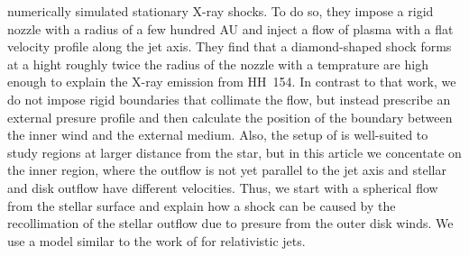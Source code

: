 \citet{2011ApJ...737...54B} numerically simulated stationary X-ray shocks. To do so, they impose a rigid nozzle with a radius of a few hundred AU and inject a flow of plasma with a flat velocity profile along the jet axis. They find that a diamond-shaped shock forms at a hight roughly twice the radius of the nozzle with a temprature are high enough to explain the X-ray emission from HH~154. In contrast to that work, we do not impose rigid boundaries that collimate the flow, but instead prescribe an external presure profile and then calculate the position of the boundary between the inner wind and the external medium. Also, the setup of \citet{2011ApJ...737...54B} is well-suited to study regions at larger distance from the star, but in this article we concentate on the inner region, where the outflow is not yet parallel to the jet axis and stellar and disk outflow have different velocities. Thus, we start with a spherical flow from the stellar surface and explain how a shock can be caused by the recollimation of the stellar outflow due to presure from the outer disk winds. We use a model similar to the work of \citet{2012MNRAS.422.2282K} for relativistic jets.